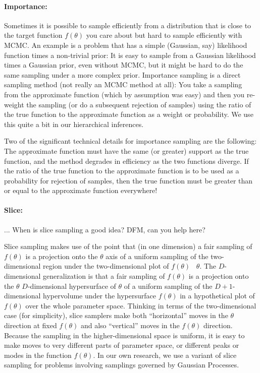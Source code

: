 \documentclass[12pt,twoside,pdftex]{article}
\newcommand{\pars}{\theta}
\begin{document}
\paragraph{Importance:}
Sometimes it is possible to sample efficiently from a distribution
that is close to the target function $f(\pars)$ you care about but
hard to sample efficiently with MCMC.
An example is a problem that has a simple (Gaussian, say) likelihood
function times a non-trivial prior:
It is easy to sample from a Gaussian likelihood times a Gaussian
prior, even without MCMC, but it might be hard to do the same sampling
under a more complex prior.
Importance sampling is a direct sampling method (not really an MCMC
method at all):
You take a sampling from the approximate function (which by assumption
was easy) and then you re-weight the sampling (or do a subsequent
rejection of samples) using the ratio of the true function to the
approximate function as a weight or probability.
We use this quite a bit in our hierarchical inferences.

Two of the significant technical details for importance sampling are the
following:
The approximate function must have the same (or greater) support as
the true function, and the method degrades in efficiency as the two
functions diverge.
If the ratio of the true function to the approximate function is to be
used as a probability for rejection of samples, then the true function
must be greater than or equal to the approximate function everywhere!

\paragraph{Slice:}
... When is slice sampling a good idea?  DFM, can you help here?

Slice sampling makes use of the point that (in one dimension) a fair
sampling of $f(\pars)$ is a projection onto the $\pars$ axis of a
uniform sampling of the two-dimensional region under the
two-dimensional plot of $f(\pars)$ \vs\ $\pars$.
The $D$-dimensional generalization is that a fair sampling of
$f(\pars)$ is a projection onto the $\pars$ $D$-dimensional
hypersurface of $\pars$ of a uniform sampling of the $D+1$-dimensional
hypervolume under the hypersurface $f(\pars)$ in a hypothetical plot
of $f(\pars)$ over the whole parameter space.
Thinking in terms of the two-dimensional case (for simplicity), slice
samplers make both ``horizontal'' moves in the $\pars$ direction at
fixed $f(\pars)$ and also ``vertical'' moves in the $f(\pars)$
direction.
Because the sampling in the higher-dimensional space is uniform, it is
easy to make moves to very different parts of parameter space, or
different peaks or modes in the function $f(\pars)$.
In our own research, we use a variant of slice sampling for problems
involving samplings governed by Gaussian Processes.
\end{document}
